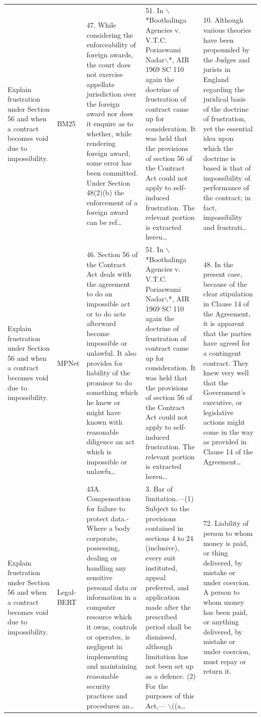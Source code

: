 \documentclass[11pt]{article}
\begin{document}
\begin{xltabular}{\textwidth}{|p{3.2cm}|p{2.2cm}|Y|Y|Y|}
        Explain frustration under Section 56 and when a contract becomes void due to impossibility. & BM25 & 47. While considering the enforceability of foreign awards, the court does not exercise appellate jurisdiction over the foreign award nor does it enquire as to whether, while rendering foreign award, some error has been committed. Under Section 48(2)(b) the enforcement of a foreign award can be ref… & 51. In $\backslash$*Boothalinga Agencies v. V.T.C. Poriaswami Nadar$\backslash$*, AIR 1969 SC 110 again the doctrine of frustration of contract came up for consideration. It was held that the provisions of section 56 of the Contract Act could not apply to self-induced frustration. The relevant portion is extracted hereu… & 10. Although various theories have been propounded by the Judges and jurists in England regarding the juridical basis of the doctrine of frustration, yet the essential idea upon which the doctrine is based is that of impossibility of performance of the contract; in fact, impossibility and frustrati… \\ 
        Explain frustration under Section 56 and when a contract becomes void due to impossibility. & MPNet & 46. Section 56 of the Contract Act deals with the agreement to do an impossible act or to do acts afterward become impossible or unlawful. It also provides for liability of the promisor to do something which he knew or might have known with reasonable diligence an act which is impossible or unlawfu… & 51. In $\backslash$*Boothalinga Agencies v. V.T.C. Poriaswami Nadar$\backslash$*, AIR 1969 SC 110 again the doctrine of frustration of contract came up for consideration. It was held that the provisions of section 56 of the Contract Act could not apply to self-induced frustration. The relevant portion is extracted hereu… & 48. In the present case, because of the clear stipulation in Clause 14 of the Agreement, it is apparent that the parties have agreed for a contingent contract. They knew very well that the Government's executive, or legislative actions might come in the way as provided in Clause 14 of the Agreement… \\ 
        Explain frustration under Section 56 and when a contract becomes void due to impossibility. & Legal-BERT & 43A. Compensation for failure to protect data.- Where a body corporate, possessing, dealing or handling any sensitive personal data or information in a computer resource which it owns, controls or operates, is negligent in implementing and maintaining reasonable security practices and procedures an… & 3. Bar of limitation.—(1) Subject to the provisions contained in sections 4 to 24 (inclusive), every suit instituted, appeal preferred, and application made after the prescribed period shall be dismissed, although limitation has not been set up as a defence. (2) For the purposes of this Act,—  $\backslash$((a… & 72. Liability of person to whom money is paid, or thing delivered, by mistake or under coercion. A person to whom money has been paid, or anything delivered, by mistake or under coercion, must repay or return it. \\ 

\end{xltabular}
\end{document}
